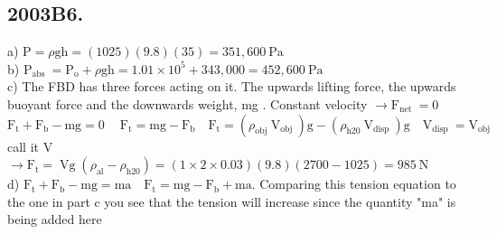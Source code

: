 \begin{enumerate}
\section*{2003B6.}
a) $\mathrm{P}=\rho \mathrm{gh}=(1025)(9.8)(35)=351,600 \mathrm{~Pa}$\\
b) $\mathrm{P}_{\text {abs }}=\mathrm{P}_{\mathrm{o}}+\rho \mathrm{gh}=1.01 \times 10^{5}+343,000=452,600 \mathrm{~Pa}$\\
c) The FBD has three forces acting on it. The upwards lifting force, the upwards buoyant force and the downwards weight, mg . Constant velocity $\rightarrow \mathrm{F}_{\text {net }}=0$\\
$\mathrm{F}_{\mathrm{t}}+\mathrm{F}_{\mathrm{b}}-\mathrm{mg}=0 \quad \mathrm{~F}_{\mathrm{t}}=\mathrm{mg}-\mathrm{F}_{\mathrm{b}} \quad \mathrm{F}_{\mathrm{t}}=\left(\rho_{\text {obj }} \mathrm{V}_{\text {obj }}\right) \mathrm{g}-\left(\rho_{\mathrm{h} 20} \mathrm{~V}_{\text {disp }}\right) \mathrm{g} \quad \mathrm{V}_{\text {disp }}=\mathrm{V}_{\text {obj }}$ call it V\\
$\rightarrow \mathrm{F}_{\mathrm{t}}=\operatorname{Vg}\left(\rho_{\mathrm{al}}-\rho_{\mathrm{h} 20}\right)=(1 \times 2 \times 0.03)(9.8)(2700-1025)=985 \mathrm{~N}$\\
d) $\mathrm{F}_{\mathrm{t}}+\mathrm{F}_{\mathrm{b}}-\mathrm{mg}=\mathrm{ma} \quad \mathrm{F}_{\mathrm{t}}=\mathrm{mg}-\mathrm{F}_{\mathrm{b}}+\mathrm{ma}$. Comparing this tension equation to the one in part c you see that the tension will increase since the quantity "ma" is being added here


\end{enumerate}
